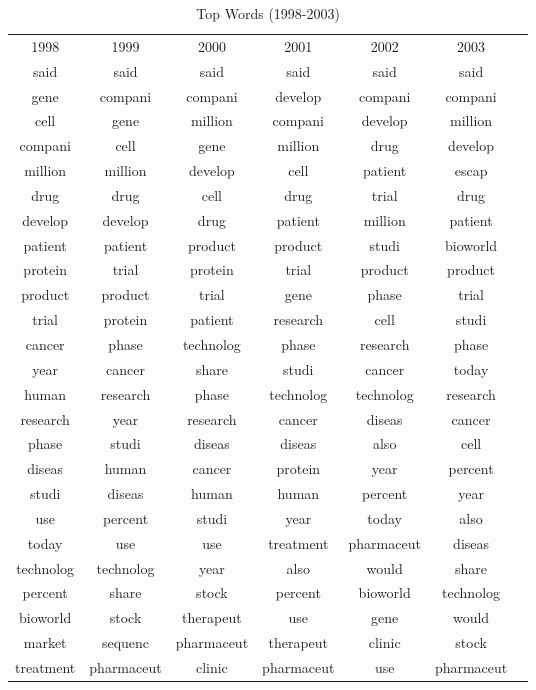 \begin{table}
\footnotesize
\begin{center}
\caption[Top Words (1998-2003)]{Top Words (1998-2003) \label{topwords2}}
\vspace{0.3in}
\begin{tabular}{ccccccc}
\hline 
\hline
1998 & 1999 & 2000 & 2001 & 2002 & 2003  \\
said & said & said & said & said & said  \\
gene & compani & compani & develop & compani & compani  \\
cell & gene & million & compani & develop & million  \\
compani & cell & gene & million & drug & develop  \\
million & million & develop & cell & patient & escap  \\
drug & drug & cell & drug & trial & drug  \\
develop & develop & drug & patient & million & patient  \\
patient & patient & product & product & studi & bioworld  \\
protein & trial & protein & trial & product & product  \\
product & product & trial & gene & phase & trial  \\
trial & protein & patient & research & cell & studi  \\
cancer & phase & technolog & phase & research & phase  \\
year & cancer & share & studi & cancer & today  \\
human & research & phase & technolog & technolog & research  \\
research & year & research & cancer & diseas & cancer  \\
phase & studi & diseas & diseas & also & cell  \\
diseas & human & cancer & protein & year & percent  \\
studi & diseas & human & human & percent & year  \\
use & percent & studi & year & today & also  \\
today & use & use & treatment & pharmaceut & diseas  \\
technolog & technolog & year & also & would & share  \\
percent & share & stock & percent & bioworld & technolog  \\
bioworld & stock & therapeut & use & gene & would  \\
market & sequenc & pharmaceut & therapeut & clinic & stock \\
treatment & pharmaceut & clinic & pharmaceut & use & pharmaceut  \\
\hline
\end{tabular}
\end{center}
\end{table}

